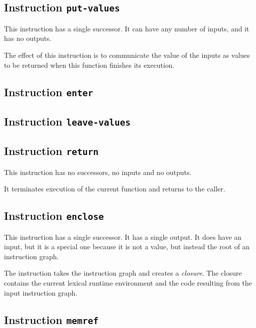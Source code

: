 \subsection{Instruction \texttt{put-values}}
\label{mir-instruction-put-values}

This instruction has a single successor.  It can have any number of
inputs, and it has no outputs. 

The effect of this instruction is to communicate the value of the
inputs as values to be returned when this function finishes its
execution.

\subsection{Instruction \texttt{enter}}
\label{mir-instruction-enter}

\subsection{Instruction \texttt{leave-values}}
\label{mir-instruction-leave-values}

\subsection{Instruction \texttt{return}}
\label{mir-instruction-return}

This instruction has no successors, no inputs and no outputs.

It terminates execution of the current function and returns to the
caller. 

\subsection{Instruction \texttt{enclose}}
\label{mir-instruction-enclose}

This instruction has a single successor.  It has a single output. 
It does have an input, but it is a special one because it is not a
value, but instead the root of an instruction graph.  

The instruction takes the instruction graph and creates a
\emph{closure}.  The closure contains the current lexical runtime
environment and the code resulting from the input instruction graph.

\subsection{Instruction \texttt{memref}}
\label{mir-instruction-memref}

